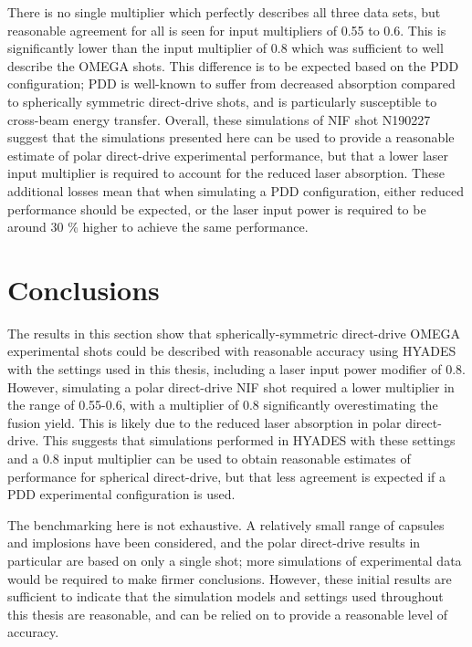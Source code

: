 There is no single multiplier which perfectly describes all three data sets, but reasonable agreement for all is seen for input multipliers of 0.55 to 0.6. This is significantly lower than the input multiplier of 0.8 which was sufficient to well describe the OMEGA shots. This difference is to be expected based on the PDD configuration; PDD is well-known to suffer from decreased absorption compared to spherically symmetric direct-drive shots, and is particularly susceptible to cross-beam energy transfer. Overall, these simulations of NIF shot N190227 suggest that the simulations presented here can be used to provide a reasonable estimate of polar direct-drive experimental performance, but that a lower laser input multiplier is required to account for the reduced laser absorption. These additional losses mean that when simulating a PDD configuration, either reduced performance should be expected, or the laser input power is required to be around 30 \% higher to achieve the same performance. 

\section{Conclusions}

The results in this section show that spherically-symmetric direct-drive OMEGA experimental shots could be described with reasonable accuracy using HYADES with the settings used in this thesis, including a laser input power modifier of 0.8. However, simulating a polar direct-drive NIF shot required a lower multiplier in the range of 0.55-0.6, with a multiplier of 0.8 significantly overestimating the fusion yield. This is likely due to the reduced laser absorption in polar direct-drive. This suggests that simulations performed in HYADES with these settings and a 0.8 input multiplier can be used to obtain reasonable estimates of performance for spherical direct-drive, but that less agreement is expected if a PDD experimental configuration is used.

The benchmarking here is not exhaustive. A relatively small range of capsules and implosions have been considered, and the polar direct-drive results in particular are based on only a single shot; more simulations of experimental data would be required to make firmer conclusions. However, these initial results are sufficient to indicate that the simulation models and settings used throughout this thesis are reasonable, and can be relied on to provide a reasonable level of accuracy.
